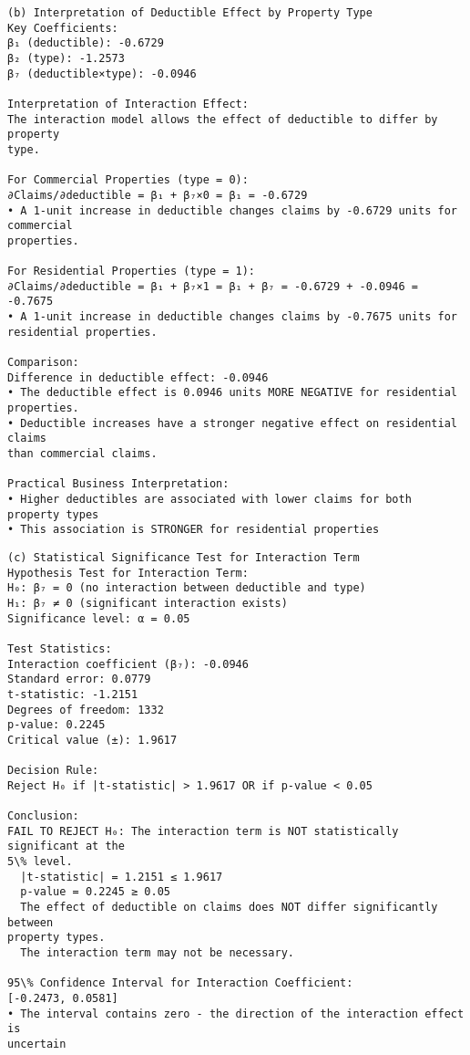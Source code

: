 \documentclass[8pt, twocolumn]{extarticle}
\begin{document}
    \begin{Verbatim}[commandchars=\\\{\}]
(b) Interpretation of Deductible Effect by Property Type
Key Coefficients:
β₁ (deductible): -0.6729
β₂ (type): -1.2573
β₇ (deductible×type): -0.0946

Interpretation of Interaction Effect:
The interaction model allows the effect of deductible to differ by property
type.

For Commercial Properties (type = 0):
∂Claims/∂deductible = β₁ + β₇×0 = β₁ = -0.6729
• A 1-unit increase in deductible changes claims by -0.6729 units for commercial
properties.

For Residential Properties (type = 1):
∂Claims/∂deductible = β₁ + β₇×1 = β₁ + β₇ = -0.6729 + -0.0946 = -0.7675
• A 1-unit increase in deductible changes claims by -0.7675 units for
residential properties.

Comparison:
Difference in deductible effect: -0.0946
• The deductible effect is 0.0946 units MORE NEGATIVE for residential
properties.
• Deductible increases have a stronger negative effect on residential claims
than commercial claims.

Practical Business Interpretation:
• Higher deductibles are associated with lower claims for both property types
• This association is STRONGER for residential properties
    \end{Verbatim}
    \begin{Verbatim}[commandchars=\\\{\}]
(c) Statistical Significance Test for Interaction Term
Hypothesis Test for Interaction Term:
H₀: β₇ = 0 (no interaction between deductible and type)
H₁: β₇ ≠ 0 (significant interaction exists)
Significance level: α = 0.05

Test Statistics:
Interaction coefficient (β₇): -0.0946
Standard error: 0.0779
t-statistic: -1.2151
Degrees of freedom: 1332
p-value: 0.2245
Critical value (±): 1.9617

Decision Rule:
Reject H₀ if |t-statistic| > 1.9617 OR if p-value < 0.05

Conclusion:
FAIL TO REJECT H₀: The interaction term is NOT statistically significant at the
5\% level.
  |t-statistic| = 1.2151 ≤ 1.9617
  p-value = 0.2245 ≥ 0.05
  The effect of deductible on claims does NOT differ significantly between
property types.
  The interaction term may not be necessary.

95\% Confidence Interval for Interaction Coefficient:
[-0.2473, 0.0581]
• The interval contains zero - the direction of the interaction effect is
uncertain
    \end{Verbatim}
\end{document}
